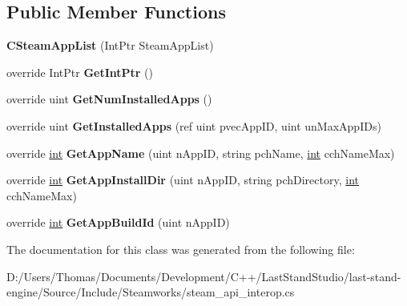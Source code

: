 \subsection*{Public Member Functions}
\begin{DoxyCompactItemize}
\item 
\hypertarget{classValve_1_1Steamworks_1_1CSteamAppList_a4907bc83c546642c5c1a5e110fbed564}{}{\bfseries C\+Steam\+App\+List} (Int\+Ptr Steam\+App\+List)\label{classValve_1_1Steamworks_1_1CSteamAppList_a4907bc83c546642c5c1a5e110fbed564}

\item 
\hypertarget{classValve_1_1Steamworks_1_1CSteamAppList_ae3923f2b48064648ac6af614f39e861b}{}override Int\+Ptr {\bfseries Get\+Int\+Ptr} ()\label{classValve_1_1Steamworks_1_1CSteamAppList_ae3923f2b48064648ac6af614f39e861b}

\item 
\hypertarget{classValve_1_1Steamworks_1_1CSteamAppList_a060d17d4c7a2aec9ccdf4969256d199a}{}override uint {\bfseries Get\+Num\+Installed\+Apps} ()\label{classValve_1_1Steamworks_1_1CSteamAppList_a060d17d4c7a2aec9ccdf4969256d199a}

\item 
\hypertarget{classValve_1_1Steamworks_1_1CSteamAppList_a98c36f0c509f3920fd0a6670738a75a8}{}override uint {\bfseries Get\+Installed\+Apps} (ref uint pvec\+App\+I\+D, uint un\+Max\+App\+I\+Ds)\label{classValve_1_1Steamworks_1_1CSteamAppList_a98c36f0c509f3920fd0a6670738a75a8}

\item 
\hypertarget{classValve_1_1Steamworks_1_1CSteamAppList_a47467db7a0a8c4a4c6812b18cdd57be7}{}override \hyperlink{SDL__thread_8h_a6a64f9be4433e4de6e2f2f548cf3c08e}{int} {\bfseries Get\+App\+Name} (uint n\+App\+I\+D, string pch\+Name, \hyperlink{SDL__thread_8h_a6a64f9be4433e4de6e2f2f548cf3c08e}{int} cch\+Name\+Max)\label{classValve_1_1Steamworks_1_1CSteamAppList_a47467db7a0a8c4a4c6812b18cdd57be7}

\item 
\hypertarget{classValve_1_1Steamworks_1_1CSteamAppList_a4a18e28a1acb2bb2babb2251ab76f52a}{}override \hyperlink{SDL__thread_8h_a6a64f9be4433e4de6e2f2f548cf3c08e}{int} {\bfseries Get\+App\+Install\+Dir} (uint n\+App\+I\+D, string pch\+Directory, \hyperlink{SDL__thread_8h_a6a64f9be4433e4de6e2f2f548cf3c08e}{int} cch\+Name\+Max)\label{classValve_1_1Steamworks_1_1CSteamAppList_a4a18e28a1acb2bb2babb2251ab76f52a}

\item 
\hypertarget{classValve_1_1Steamworks_1_1CSteamAppList_a29b1d8fefc63dbb06f3c0fe70bc548f1}{}override \hyperlink{SDL__thread_8h_a6a64f9be4433e4de6e2f2f548cf3c08e}{int} {\bfseries Get\+App\+Build\+Id} (uint n\+App\+I\+D)\label{classValve_1_1Steamworks_1_1CSteamAppList_a29b1d8fefc63dbb06f3c0fe70bc548f1}

\end{DoxyCompactItemize}


The documentation for this class was generated from the following file\+:\begin{DoxyCompactItemize}
\item 
D\+:/\+Users/\+Thomas/\+Documents/\+Development/\+C++/\+Last\+Stand\+Studio/last-\/stand-\/engine/\+Source/\+Include/\+Steamworks/steam\+\_\+api\+\_\+interop.\+cs\end{DoxyCompactItemize}
